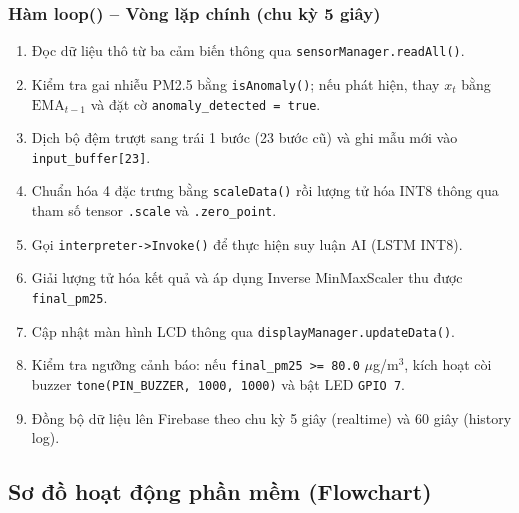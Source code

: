 \documentclass[12pt,a4paper]{article}
\begin{document}
\subsubsection{Hàm loop() -- Vòng lặp chính (chu kỳ 5 giây)}

\begin{enumerate}
    \item Đọc dữ liệu thô từ ba cảm biến thông qua \texttt{sensorManager.readAll()}.
    \item Kiểm tra gai nhiễu PM2.5 bằng \texttt{isAnomaly()}; nếu phát hiện, thay $x_t$ bằng $\text{EMA}_{t-1}$ và đặt cờ \texttt{anomaly\_detected = true}.
    \item Dịch bộ đệm trượt sang trái 1 bước (23 bước cũ) và ghi mẫu mới vào \texttt{input\_buffer[23]}.
    \item Chuẩn hóa 4 đặc trưng bằng \texttt{scaleData()} rồi lượng tử hóa INT8 thông qua tham số tensor \texttt{.scale} và \texttt{.zero\_point}.
    \item Gọi \texttt{interpreter->Invoke()} để thực hiện suy luận AI (LSTM INT8).
    \item Giải lượng tử hóa kết quả và áp dụng Inverse MinMaxScaler thu được \texttt{final\_pm25}.
    \item Cập nhật màn hình LCD thông qua \texttt{displayManager.updateData()}.
    \item Kiểm tra ngưỡng cảnh báo: nếu \texttt{final\_pm25 >= 80.0} $\mu$g/m$^3$, kích hoạt còi buzzer \texttt{tone(PIN\_BUZZER, 1000, 1000)} và bật LED \texttt{GPIO 7}.
    \item Đồng bộ dữ liệu lên Firebase theo chu kỳ 5 giây (realtime) và 60 giây (history log).
\end{enumerate}

\subsection{Sơ đồ hoạt động phần mềm (Flowchart)}
\end{document}
